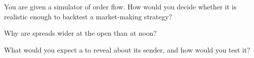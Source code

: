 \begin{interviewq}\label{iq:mx:empirical-facts-of-order-books:4}
You are given a simulator of order flow. How would you decide whether it is realistic enough to backtest a market-making strategy?
\end{interviewq}

\begin{interviewq}\label{iq:mx:empirical-facts-of-order-books:5}
Why are spreads wider at the open than at noon?
\end{interviewq}

\begin{interviewq}\label{iq:mx:empirical-facts-of-order-books:6}
What would you expect a  to reveal about its sender, and how would you test it?
\end{interviewq}
